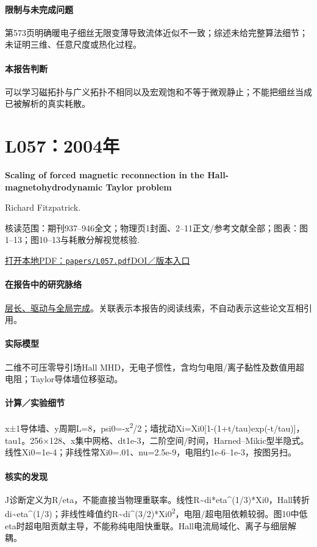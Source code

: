 \documentclass[UTF8,a4paper,11pt,openany,fontset=fandol]{ctexbook}
\begin{document}
\paragraph{限制与未完成问题}第573页明确暖电子细丝无限变薄导致流体近似不一致；综述未给完整算法细节；未证明三维、任意尺度或热化过程。

\paragraph{本报告判断}可以学习磁拓扑与广义拓扑不相同以及宏观饱和不等于微观静止；不能把细丝当成已被解析的真实耗散。

\section{L057：2004年}\label{paper:L057}

\textbf{Scaling of forced magnetic reconnection in the Hall-magnetohydrodynamic Taylor problem}\citep{L057}\

Richard Fitzpatrick.

\textsf{核读范围：}期刊937–946全文；物理页1封面、2–11正文/参考文献全部；\textsf{图表：}图1–13；图10–13与耗散分解视觉核验.

\href{run:../papers/L057.pdf}{打开本地PDF：\texttt{papers/L057.pdf}}\quad\href{https://doi.org/10.1063/1.1640378}{DOI／版本入口}

\paragraph{在报告中的研究脉络}\hyperref[story:global]{层长、驱动与全局完成}。关联表示本报告的阅读线索，不自动表示这些论文互相引用。

\paragraph{实际模型}二维不可压零导引场Hall MHD，无电子惯性，含均匀电阻/离子黏性及数值用超电阻；Taylor导体墙位移驱动。

\paragraph{计算／实验细节}x±1导体墙、y周期L=8，psi0=-x\textsuperscript{2}/2；墙扰动Xi=Xi0[1-(1+t/tau)exp(-t/tau)]，tau1。256×128、x集中网格、dt1e-3，二阶空间/时间，Harned–Mikic型半隐式。线性Xi0=1e-4；非线性常Xi0=.01、nu=2.5e-9，电阻约1e-6–1e-3，按图另扫。

\paragraph{核实的发现}J诊断定义为R/eta，不能直接当物理重联率。线性R\textasciitilde{}di*eta\textasciicircum{}(1/3)*Xi0，Hall转折di\textasciitilde{}eta\textasciicircum{}(1/3)；非线性峰值约R\textasciitilde{}di\textasciicircum{}(3/2)*Xi0\textsuperscript{2}，电阻/超电阻依赖较弱。图10中低eta时超电阻贡献主导，不能称纯电阻快重联。Hall电流局域化、离子与细层解耦。
\end{document}
